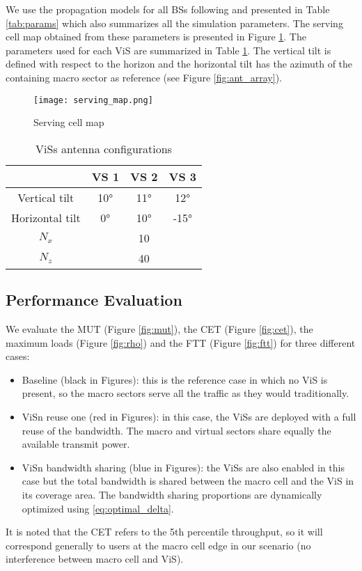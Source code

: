 \documentclass[conference]{IEEEtran}
\begin{document}
	We use the propagation models for all \acp{BS} following \cite[Page 61]{3gpp_evolveduniversalterrestrial_2010} and presented in Table \ref{tab:params} which also summarizes all the simulation parameters. The serving cell map obtained from these parameters is presented in Figure \ref{fig:serving_map}. The parameters used for each \ac{ViS} are summarized in Table \ref{tab:antennas}. The vertical tilt is defined with respect to the horizon and the horizontal tilt has the azimuth of the containing macro sector as reference (see Figure \ref{fig:ant_array}).

\begin{figure}[!ht]
\centering
\texttt{[image: serving\_map.png]}
\caption{Serving cell map}
\label{fig:serving_map}
\end{figure}

\begin{table}[!t]
\small
\renewcommand{\arraystretch}{1.3}
\caption{\ac{ViS}s antenna configurations}
\label{tab:antennas}
\centering
\begin{tabular}{|c|c|c|c|}
    \cline{2-4}
    \multicolumn{1}{c|}{} & VS 1 & VS 2 & VS 3 \\ \hline
    Vertical tilt & 10°  & 11° & 12°  \\ \hline
    Horizontal tilt & 0° & 10° & -15°  \\ \hline
    $N_x$ & \multicolumn{3}{|c|}{10}  \\ \hline
    $N_z$ & \multicolumn{3}{|c|}{40} \\ \hline
\end{tabular}
\end{table}

\subsection{Performance Evaluation}

	We evaluate the \ac{MUT} (Figure \ref{fig:mut}), the \ac{CET} (Figure \ref{fig:cet}), the maximum loads (Figure \ref{fig:rho}) and the \ac{FTT} (Figure \ref{fig:ftt})  for three different cases:
	\begin{itemize}
	\item Baseline (black in Figures): this is the reference case in which no \ac{ViS} is present, so the macro sectors serve all the traffic as they would traditionally.
	\item \ac{ViSn} reuse one (red in Figures): in this case, the \acp{ViS} are deployed with a full reuse of the bandwidth. The macro and virtual sectors share equally the available transmit power.
	\item \ac{ViSn} bandwidth sharing (blue in Figures): the \acp{ViS} are also enabled in this case but the total bandwidth is shared between the macro cell and the \ac{ViS} in its coverage area. The bandwidth sharing proportions are dynamically optimized using \eqref{eq:optimal_delta}.
	\end{itemize}
	It is noted that the \ac{CET} refers to the 5th percentile throughput, so it will correspond generally to users at the macro cell edge in our scenario (no interference between macro cell and \ac{ViS}).
\end{document}
